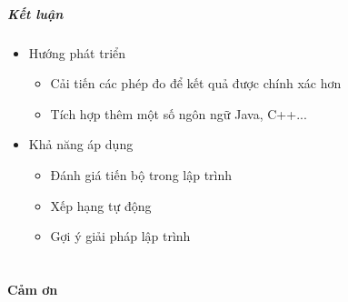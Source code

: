 \documentclass{beamer}
\begin{document}
\begin{frame}
  \frametitle{Kết luận}
  \begin{itemize}
  	\item Hướng phát triển
  	\begin{itemize}
  		\item Cải tiến các phép đo để kết quả được chính xác hơn
  		\item Tích hợp thêm một số ngôn ngữ Java, C++...
  	\end{itemize}
  	\item Khả năng áp dụng
  	\begin{itemize}
  		\item Đánh giá tiến bộ trong lập trình
  		\item Xếp hạng tự động
  		\item Gợi ý giải pháp lập trình
  	\end{itemize}
  \end{itemize}
\end{frame}


\part{}

\begin{frame}
  \begin{center}
    \begin{Huge}
      \textbf{Cảm ơn}
    \end{Huge}
\end{center}

\end{frame}



\end{document}
